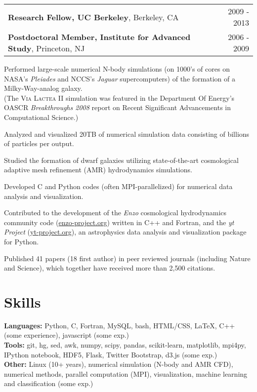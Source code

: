 \begin{resume}
\hspace*{-0.1in}
\begin{tabularx}{1.025\textwidth}{Xr}
\textbf{Research Fellow, UC Berkeley}, Berkeley, CA & 2009 - 2013 \\
\textbf{Postdoctoral Member, Institute for Advanced Study}, Princeton, NJ & 2006 - 2009 \\
\end{tabularx}
\vspace*{0.025in}
\begin{list1}
\item Performed large-scale numerical N-body simulations (on 1000's of cores on NASA's \textit{Pleiades} and NCCS's \textit{Jaguar} supercomputers) of the formation of a Milky-Way-analog galaxy. \\
(The \textsc{Via Lactea II} simulation was featured in the Department Of Energy's OASCR \textit{Breakthroughs 2008} report on Recent Significant Advancements in Computational Science.)
\item Analyzed and visualized 20TB of numerical simulation data consisting of billions of particles per output.
\item Studied the formation of dwarf galaxies utilizing state-of-the-art cosmological adaptive mesh refinement (AMR) hydrodynamics simulations.
\item Developed C and Python codes (often MPI-parallelized) for numerical data analysis and visualization.
\item Contributed to the development of the \textit{Enzo} cosmological hydrodynamics community code (\url{enzo-project.org}) written in C++ and Fortran, and the \textit{yt Project} (\url{yt-project.org}), an astrophysics data analysis and visualization package for Python.
\item Published 41 papers (18 first author) in peer reviewed journals (including Nature and Science), which together have received more than 2,500 citations.
\end{list1}

\section{\sc Skills}
\textbf{Languages:} Python, C, Fortran, MySQL, bash, HTML/CSS, \LaTeX, C++ (some experience), javascript (some exp.) \vspace{0.05in} \\
\textbf{Tools:} git, hg, sed, awk, numpy, scipy, pandas, scikit-learn, matplotlib, mpi4py, IPython notebook, HDF5, Flask, Twitter Bootstrap, d3.js (some exp.) \vspace{0.05in} \\
\textbf{Other:} Linux (10+ years), numerical simulation (N-body and AMR CFD), numerical methods, parallel computation (MPI), visualization, machine learning and classification (some exp.) 


\end{resume}
